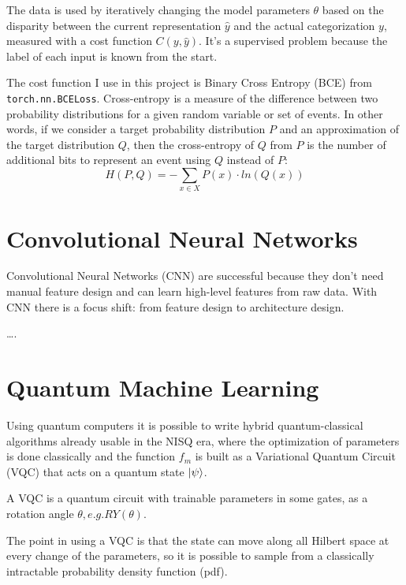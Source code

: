 \documentclass[
  13pt,
  a4paper,
  DIV=11,
  numbers=noendperiod]{scrreprt}
\begin{document}
The data is used by iteratively changing the model parameters \(\theta\)
based on the disparity between the current representation
\(\widehat{y}\) and the actual categorization \(y\), measured with a
cost function \(C(y, \widehat{y})\). It's a supervised problem because
the label of each input is known from the start.

The cost function I use in this project is Binary Cross Entropy (BCE)
from \texttt{torch.nn.BCELoss}. Cross-entropy is a measure of the
difference between two probability distributions for a given random
variable or set of events. In other words, if we consider a target
probability distribution \(P\) and an approximation of the target
distribution \(Q\), then the cross-entropy of \(Q\) from \(P\) is the
number of additional bits to represent an event using \(Q\) instead of
\(P\): \[
H(P,Q) = - \sum_{x \in X} P(x) \cdot ln(Q(x))
\]

\section{Convolutional Neural
Networks}\label{convolutional-neural-networks}

Convolutional Neural Networks (CNN) are successful because they don't
need manual feature design and can learn high-level features from raw
data. With CNN there is a focus shift: from feature design to
architecture design.

\ldots.

\section{Quantum Machine Learning}\label{quantum-machine-learning}

Using quantum computers it is possible to write hybrid quantum-classical
algorithms already usable in the NISQ era, where the optimization of
parameters is done classically and the function \(f_m\) is built as a
Variational Quantum Circuit (VQC) that acts on a quantum state
\(\ket{\psi}\).

A VQC is a quantum circuit with trainable parameters in some gates, as a
rotation angle \(\theta, e.g. RY(\theta)\).

The point in using a VQC is that the state can move along all Hilbert
space at every change of the parameters, so it is possible to sample
from a classically intractable probability density function (pdf).
\end{document}
